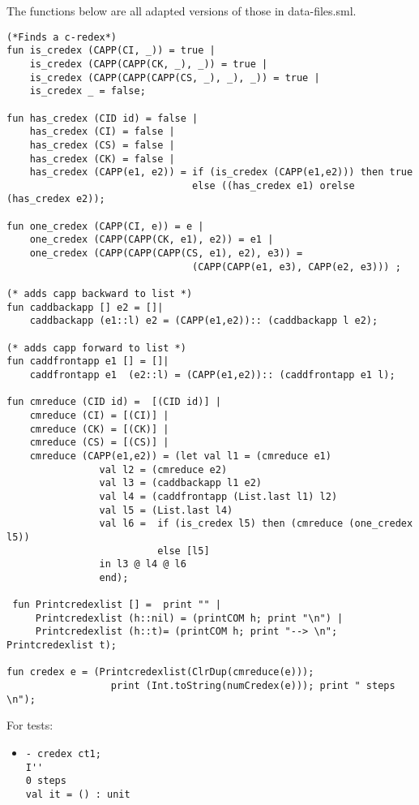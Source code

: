 \documentclass[11pt]{article}
\begin{document}
\begin{enumerate}
	      \color{red}
	      The functions below are all adapted versions of those in data-files.sml.
	      
	      \begin{verbatim}
(*Finds a c-redex*)
fun is_credex (CAPP(CI, _)) = true |
    is_credex (CAPP(CAPP(CK, _), _)) = true |
    is_credex (CAPP(CAPP(CAPP(CS, _), _), _)) = true |
    is_credex _ = false;

fun has_credex (CID id) = false |
    has_credex (CI) = false |
    has_credex (CS) = false |
    has_credex (CK) = false |
    has_credex (CAPP(e1, e2)) = if (is_credex (CAPP(e1,e2))) then true 
                                else ((has_credex e1) orelse (has_credex e2));

fun one_credex (CAPP(CI, e)) = e |
    one_credex (CAPP(CAPP(CK, e1), e2)) = e1 |
    one_credex (CAPP(CAPP(CAPP(CS, e1), e2), e3)) =
                                (CAPP(CAPP(e1, e3), CAPP(e2, e3))) ;

(* adds capp backward to list *)
fun caddbackapp [] e2 = []|
    caddbackapp (e1::l) e2 = (CAPP(e1,e2)):: (caddbackapp l e2);

(* adds capp forward to list *)
fun caddfrontapp e1 [] = []|
    caddfrontapp e1  (e2::l) = (CAPP(e1,e2)):: (caddfrontapp e1 l);

fun cmreduce (CID id) =  [(CID id)] | 
    cmreduce (CI) = [(CI)] |
    cmreduce (CK) = [(CK)] |
    cmreduce (CS) = [(CS)] |
    cmreduce (CAPP(e1,e2)) = (let val l1 = (cmreduce e1)
                val l2 = (cmreduce e2)
                val l3 = (caddbackapp l1 e2)				
                val l4 = (caddfrontapp (List.last l1) l2)
                val l5 = (List.last l4)
                val l6 =  if (is_credex l5) then (cmreduce (one_credex l5)) 
                          else [l5]
                in l3 @ l4 @ l6
                end);
                
 fun Printcredexlist [] =  print "" |
     Printcredexlist (h::nil) = (printCOM h; print "\n") |
     Printcredexlist (h::t)= (printCOM h; print "--> \n"; Printcredexlist t);

fun	credex e = (Printcredexlist(ClrDup(cmreduce(e))); 
                  print (Int.toString(numCredex(e))); print " steps \n");
	      \end{verbatim}
	      
	      For tests:
	      \begin{itemize}
	      	\item
	      	      \begin{verbatim}
- credex ct1;
I''
0 steps
val it = () : unit


\end{verbatim}
\end{itemize}
\end{enumerate}
\end{document}
